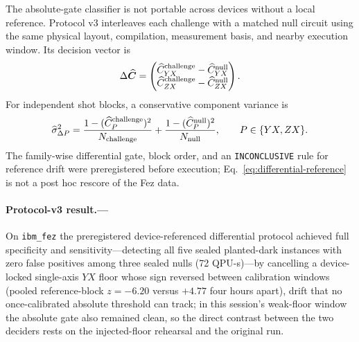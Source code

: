 \documentclass[aps,prl,onecolumn,superscriptaddress,nofootinbib]{revtex4-2}
\begin{document}
The absolute-gate classifier is not portable across devices without a local reference.  Protocol v3 interleaves each challenge with a matched null circuit using the same physical layout, compilation, measurement basis, and nearby execution window.  Its decision vector is
\begin{equation}
 \Delta\widehat{\bm C}=
 \begin{pmatrix}
 \widehat C_{YX}^{\rm challenge}-\widehat C_{YX}^{\rm null}\\
 \widehat C_{ZX}^{\rm challenge}-\widehat C_{ZX}^{\rm null}
 \end{pmatrix}.
 \label{eq:differential-reference}
\end{equation}
For independent shot blocks, a conservative component variance is
\begin{equation}
 \widehat\sigma_{\Delta P}^2=
 \frac{1-(\widehat C_P^{\rm challenge})^2}{N_{\rm challenge}}
 +\frac{1-(\widehat C_P^{\rm null})^2}{N_{\rm null}},
 \qquad P\in\{YX,ZX\}.
 \label{eq:differential-variance}
\end{equation}
The family-wise differential gate, block order, and an \texttt{INCONCLUSIVE} rule for reference drift were preregistered before execution; Eq.~\eqref{eq:differential-reference} is not a post hoc rescore of the Fez data.

\paragraph{Protocol-v3 result.---}
On \texttt{ibm\_fez} the preregistered device-referenced differential protocol achieved full specificity and sensitivity---detecting all five sealed planted-dark instances with zero false positives among three sealed nulls (72 QPU-s)---by cancelling a device-locked single-axis $YX$ floor whose sign reversed between calibration windows (pooled reference-block $z=-6.20$ versus $+4.77$ four hours apart), drift that no once-calibrated absolute threshold can track; in this session's weak-floor window the absolute gate also remained clean, so the direct contrast between the two deciders rests on the injected-floor rehearsal and the original run.
\end{document}
